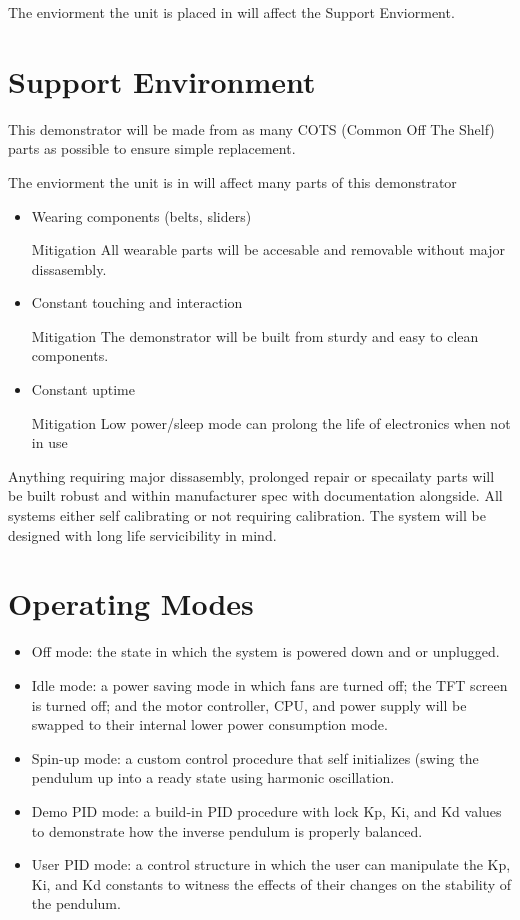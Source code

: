\documentclass{article}
\begin{document}
The enviorment the unit is placed in will affect the Support Enviorment.


\section{Support Environment}

This demonstrator will be made from as many COTS (Common Off The Shelf) parts
as possible to ensure simple replacement.

The enviorment the unit is in will affect many parts of this demonstrator

\begin{itemize}
    \item Wearing components (belts, sliders)
    \item[Mitigation] All wearable parts will be accesable and removable without major dissasembly.
    \item Constant touching and interaction
    \item[Mitigation] The demonstrator will be built from sturdy and easy to clean components.
    \item Constant uptime
    \item[Mitigation] Low power/sleep mode can prolong the life of electronics when not in use
\end{itemize}

Anything requiring major dissasembly, prolonged repair or specailaty parts will be built robust and
within manufacturer spec with documentation alongside. All systems either self calibrating or
not requiring calibration. The system will be designed with long life servicibility in mind.


\section{Operating Modes}

\begin{itemize}
    \item Off mode: the state in which the system is powered down and or unplugged.
    \item Idle mode: a power saving mode in which fans are turned off; the TFT screen is turned off; and the motor controller, CPU, and power supply will be swapped to their internal lower power consumption mode.
    \item Spin-up mode: a custom control procedure that self initializes (swing the pendulum up into a ready state using harmonic oscillation.
    \item Demo PID mode: a build-in PID procedure with lock Kp, Ki, and Kd values to demonstrate how the inverse pendulum is properly balanced.
    \item User PID mode: a control structure in which the user can manipulate the Kp, Ki, and Kd constants to witness the effects of their changes on the stability of the pendulum.
\end{itemize}
\end{document}
